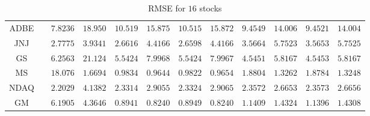 \documentclass[12pt, A4]{article}
\begin{document}
\begin{landscape}
\begin{table}[H]
\begin{center}
\begin{tabular}{| c | c | c | c | c | c | c | c | c | c | c | c |}
				ADBE & \cellcolor{blue!25}  \boldmath{$3.9097$} & $7.8236$ & $18.950$ & $10.519$ & $15.875$ & $10.515$ & $15.872$ & $9.4549$ & $14.006$ & $9.4521$ & $14.004$\\ \cline{1-12}
				JNJ & \cellcolor{blue!25}  \boldmath{$1.3145$} & $2.7775$ & $3.9341$ & $2.6616$ & $4.4166$ & $2.6598$ & $4.4166$ & $3.5664$ & $5.7523$ & $3.5653$ & $5.7525$\\ \cline{1-12}
				GS & \cellcolor{blue!25}  \boldmath{$3.8214$} & $6.2563$ & $21.124$ & $5.5424$ & $7.9968$ & $5.5424$ & $7.9967$ & $4.5451$ & $5.8167$ & $4.5453$ & $5.8167$\\ \cline{1-12}
				MS & \cellcolor{blue!25}  \boldmath{$0.8915$} & $18.076$ & $1.6694$ & $0.9834$ & $0.9644$ & $0.9822$ & $0.9654$ & $1.8804$ & $1.3262$ & $1.8784$ & $1.3248$\\ \cline{1-12}
				NDAQ & \cellcolor{blue!25}  \boldmath{$1.9477$} & $2.2029$ & $4.1382$ & $2.3314$ & $2.9055$ & $2.3324$ & $2.9065$ & $2.3572$ & $2.6653$ & $2.3573$ & $2.6656$\\ \cline{1-12}
				GM & \cellcolor{blue!25}  \boldmath{$0.7346$} & $6.1905$ & $4.3646$ & $0.8941$ & $0.8240$ & $0.8949$ & $0.8240$ & $1.1409$ & $1.4324$ & $1.1396$ & $1.4308$\\ \cline{1-12}
			\end{tabular}
			\caption{RMSE for $16$ stocks} \label{stocks RMSE_results}
		\end{center}
	\end{table}
\end{landscape}
\end{document}
